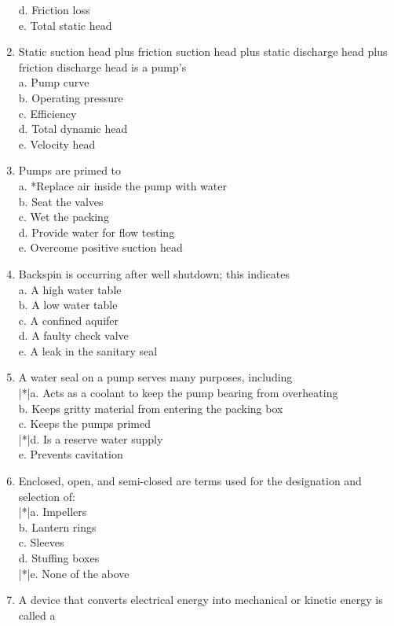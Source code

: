 \begin{enumerate}[1.]
d. Friction loss\\
e. Total static head\\
\item Static suction head plus friction suction head plus static discharge head plus friction discharge head is a pump's\\
a. Pump curve\\
b. Operating pressure\\
c. Efficiency\\
d. Total dynamic head\\
e. Velocity head\\
\item Pumps are primed to\\
a. *Replace air inside the pump with water\\
b. Seat the valves\\
c. Wet the packing\\
d. Provide water for flow testing\\
e. Overcome positive suction head\\
\item Backspin is occurring after well shutdown; this indicates\\
a. A high water table\\
b. A low water table\\
c. A confined aquifer\\
d. A faulty check valve\\
e. A leak in the sanitary seal\\
\item A water seal on a pump serves many purposes, including\\
|*|a. Acts as a coolant to keep the pump bearing from overheating\\
b. Keeps gritty material from entering the packing box\\
c. Keeps the pumps primed\\
|*|d. Is a reserve water supply\\
e. Prevents cavitation\\
\item Enclosed, open, and semi-closed are terms used for the designation and selection of:\\
|*|a. Impellers\\
b. Lantern rings\\
c. Sleeves\\
d. Stuffing boxes\\
|*|e. None of the above\\
\item A device that converts electrical energy into mechanical or kinetic energy is called a\\

\end{enumerate}

